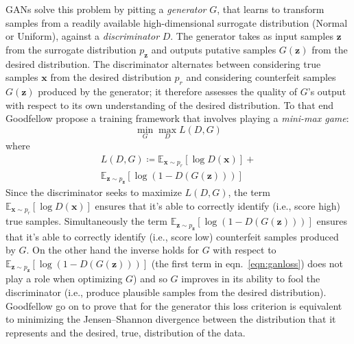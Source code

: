 GANs solve this problem by pitting a \textit{generator} \(G\), that learns to transform samples from a readily available high-dimensional surrogate distribution (Normal or Uniform), against a \textit{discriminator} \(D\).
The generator takes as input samples \(\bm{z}\) from the surrogate distribution \(p_{\bm{z}}\) and outputs putative samples \(G(\bm{z})\) from the desired distribution.
%
The discriminator alternates between considering true samples \(\bm{x}\) from the desired distribution \(p_r\) and considering counterfeit samples \(G(\bm{z})\) produced by the generator; it therefore assesses the quality of \(G\)'s output with respect to its own understanding of the desired distribution.
%
To that end Goodfellow \etal\cite{goodfellow2014generative} propose a training framework that involves playing a \textit{mini-max game}:
\begin{equation}
    \min_G \max_D L(D, G)
\end{equation}
where
\begin{multline}
    L(D, G) \coloneqq \mathbb{E}_{\bm{x} \sim p_{r}} [\log D(\bm{x})] + \\ \mathbb{E}_{\bm{z} \sim p_{\bm{z}} } [\log(1 - D(G(\bm{z})))]
    \label{eqn:ganloss}
\end{multline}
Since the discriminator seeks to maximize \(L(D, G)\), the term \(\mathbb{E}_{\bm{x} \sim p_{r}} [\log D(\bm{x})]\) ensures that it's able to correctly identify (i.e., score high) true samples.
%
Simultaneously the term \(\mathbb{E}_{\bm{z} \sim p_{\bm{z}} } [\log(1 - D(G(\bm{z})))] \) ensures that it's able to correctly identify (i.e., score low) counterfeit samples produced by \(G\).
%
On the other hand the inverse holds for \(G\) with respect to \(\mathbb{E}_{\bm{z} \sim p_{\bm{z}} } [\log(1 - D(G(\bm{z})))]\) (the first term in eqn.~\eqref{eqn:ganloss}) does not play a role when optimizing \(G\)) and so \(G\) improves in its ability to fool the discriminator (i.e., produce plausible samples from the desired distribution).
%
Goodfellow \etal go on to prove that for the generator this loss criterion is equivalent to minimizing the Jensen–Shannon divergence between the distribution that it represents and the desired, true, distribution of the data.
